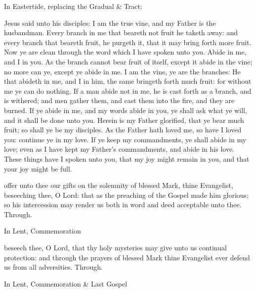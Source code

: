 \begin{rubric}
{In Eastertide, replacing the Gradual \& Tract:}
\end{rubric}\par\noindent


 Jesus said unto his disciples: I am the true vine, and my Father is the husbandman. Every branch in me that beareth not fruit he taketh away: and every branch that beareth fruit, he purgeth it, that it may bring forth more fruit. Now ye are clean through the word which I have spoken unto you. Abide in me, and I in you. As the branch cannot bear fruit of itself, except it abide in the vine; no more can ye, except ye abide in me. I am the vine, ye are the branches: He that abideth in me, and I in him, the same bringeth forth much fruit: for without me ye can do nothing. If a man abide not in me, he is cast forth as a branch, and is withered; and men gather them, and cast them into the fire, and they are burned. If ye abide in me, and my words abide in you, ye shall ask what ye will, and it shall be done unto you. Herein is my Father glorified, that ye bear much fruit; so shall ye be my disciples. As the Father hath loved me, so have I loved you: continue ye in my love. If ye keep my commandments, ye shall abide in my love; even as I have kept my Father's commandments, and abide in his love. These things have I spoken unto you, that my joy might remain in you, and that your joy might be full.

\secret
{} offer unto thee our gifts on the solemnity of blessed Mark, thine Evangelist, beseeching thee, O Lord: that as the preaching of the Gospel made him glorious; so his intercession may render us both in word and deed acceptable unto thee. Through.
\begin{rubric}
    In Lent, Commemoration %
\end{rubric}
\postcommunion
{} beseech thee, O Lord, that thy holy mysteries may give unto us continual protection: and through the prayers of blessed Mark thine Evangelist ever defend us from all adversities. Through.
\begin{rubric}
    In Lent, Commemoration \& Last Gospel 
\end{rubric}


